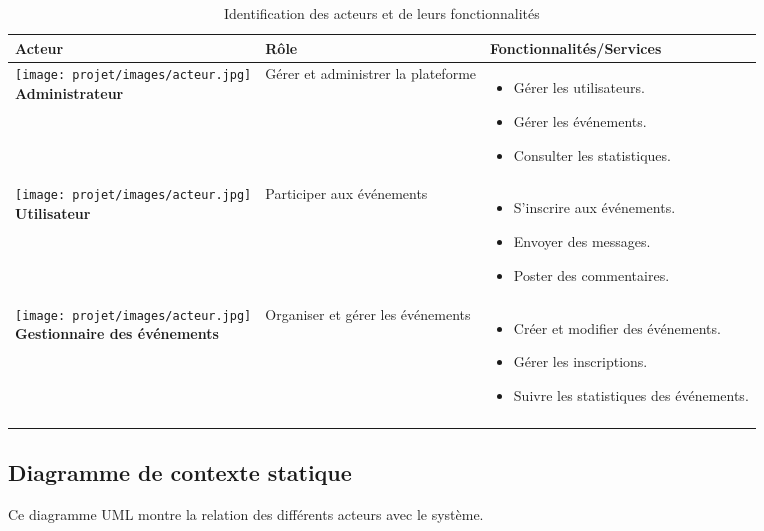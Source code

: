 \begin{longtable}{|p{4cm}|p{5cm}|p{6cm}|}
\hline
\textbf{Acteur} & \textbf{Rôle} & \textbf{Fonctionnalités/Services} \\ 
\hline
\parbox[c][3.5cm][c]{\linewidth}{\centering
\texttt{[image: projet/images/acteur.jpg]} \\[0.2cm] \textbf{Administrateur}
} & 
Gérer et administrer la plateforme & 
\begin{itemize}[leftmargin=0.5cm]
    \item Gérer les utilisateurs.
    \item Gérer les événements.
    \item Consulter les statistiques.
\end{itemize} \\ 
\hline

\parbox[c][3.5cm][c]{\linewidth}{\centering
\texttt{[image: projet/images/acteur.jpg]} \\[0.2cm] \textbf{Utilisateur}
} & 
Participer aux événements & 
\begin{itemize}[leftmargin=0.5cm]
    \item S’inscrire aux événements.
    \item Envoyer des messages.
    \item Poster des commentaires.
\end{itemize} \\ 
\hline

\parbox[c][3.5cm][c]{\linewidth}{\centering
\texttt{[image: projet/images/acteur.jpg]} \\[0.2cm] \textbf{Gestionnaire des événements}
} & 
Organiser et gérer les événements & 
\begin{itemize}[leftmargin=0.5cm]
    \item Créer et modifier des événements.
    \item Gérer les inscriptions.
    \item Suivre les statistiques des événements.
\end{itemize} \\ 
\hline
\caption{Identification des acteurs et de leurs fonctionnalités}
\label{tab:identification_acteurs}
\end{longtable}


\subsection{Diagramme de contexte statique}
Ce diagramme UML montre la relation des différents acteurs avec le système.

